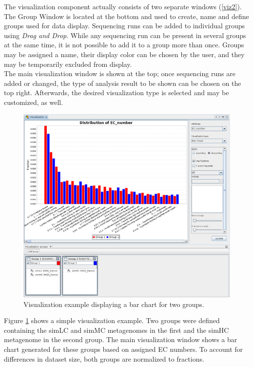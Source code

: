 The visualization component actually consists of two separate windows (\ref{viz2}). The Group
Window is located at the bottom and used to create, name and define groups used for data display.
Sequencing runs can be added to individual groups using \textit{Drag and Drop}. While any
sequencing run can be present in several groups at the same time, it is not possible to add
it to a group more than once. Groups may be assigned a name, their display color can be chosen
by the user, and they may be temporarily excluded from display.\\
The main visualization window is shown at the top; once sequencing runs are added or changed, 
the type of analysis result to be shown can be chosen on the top right. Afterwards, the desired
visualization type is selected and may be customized, as well.

\begin{figure}[H]
\centering
\includegraphics[width=\textwidth]{img/mgx/VizDemo}
\caption[Visualization example]{Visualization example displaying a bar chart for two groups.}
\label{viz3}
\end{figure}

Figure \ref{viz3} shows a simple visualization example. Two groups were defined containing the simLC and simMC metagenomes
in the first and the simHC metagenome in the second group. The main visualization window shows a bar chart
generated for these groups based on assigned EC numbers. To account for differences in dataset size, both
groups are normalized to fractions.

